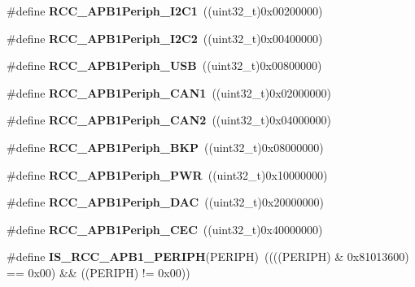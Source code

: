 \begin{DoxyCompactItemize}
\item 
\hypertarget{group__APB1__peripheral_ga594f87d504f7d63697d841033d1538f6}{
\#define {\bfseries RCC\_\-APB1Periph\_\-I2C1}~((uint32\_\-t)0x00200000)}
\label{group__APB1__peripheral_ga594f87d504f7d63697d841033d1538f6}

\item 
\hypertarget{group__APB1__peripheral_ga8eaeded403b5a2277fbfb3896c639416}{
\#define {\bfseries RCC\_\-APB1Periph\_\-I2C2}~((uint32\_\-t)0x00400000)}
\label{group__APB1__peripheral_ga8eaeded403b5a2277fbfb3896c639416}

\item 
\hypertarget{group__APB1__peripheral_ga69a1b3de9a59155bc8455eea5a15e3e4}{
\#define {\bfseries RCC\_\-APB1Periph\_\-USB}~((uint32\_\-t)0x00800000)}
\label{group__APB1__peripheral_ga69a1b3de9a59155bc8455eea5a15e3e4}

\item 
\hypertarget{group__APB1__peripheral_ga7f1d940739de0134ae89e9e04214989d}{
\#define {\bfseries RCC\_\-APB1Periph\_\-CAN1}~((uint32\_\-t)0x02000000)}
\label{group__APB1__peripheral_ga7f1d940739de0134ae89e9e04214989d}

\item 
\hypertarget{group__APB1__peripheral_ga62801597b97816751c038acb1466179c}{
\#define {\bfseries RCC\_\-APB1Periph\_\-CAN2}~((uint32\_\-t)0x04000000)}
\label{group__APB1__peripheral_ga62801597b97816751c038acb1466179c}

\item 
\hypertarget{group__APB1__peripheral_ga2a26b65d0e38030e414a9d39276645b1}{
\#define {\bfseries RCC\_\-APB1Periph\_\-BKP}~((uint32\_\-t)0x08000000)}
\label{group__APB1__peripheral_ga2a26b65d0e38030e414a9d39276645b1}

\item 
\hypertarget{group__APB1__peripheral_ga59ae4e17d5b35a934b1614f8ee883834}{
\#define {\bfseries RCC\_\-APB1Periph\_\-PWR}~((uint32\_\-t)0x10000000)}
\label{group__APB1__peripheral_ga59ae4e17d5b35a934b1614f8ee883834}

\item 
\hypertarget{group__APB1__peripheral_ga8d019a727701634822c19371b6aaabb5}{
\#define {\bfseries RCC\_\-APB1Periph\_\-DAC}~((uint32\_\-t)0x20000000)}
\label{group__APB1__peripheral_ga8d019a727701634822c19371b6aaabb5}

\item 
\hypertarget{group__APB1__peripheral_gaa96437b649e13586945f40dac318a0ae}{
\#define {\bfseries RCC\_\-APB1Periph\_\-CEC}~((uint32\_\-t)0x40000000)}
\label{group__APB1__peripheral_gaa96437b649e13586945f40dac318a0ae}

\item 
\hypertarget{group__APB1__peripheral_gab68e85308494436c4c55a69c42a79f36}{
\#define {\bfseries IS\_\-RCC\_\-APB1\_\-PERIPH}(PERIPH)~((((PERIPH) \& 0x81013600) == 0x00) \&\& ((PERIPH) != 0x00))}
\label{group__APB1__peripheral_gab68e85308494436c4c55a69c42a79f36}

\end{DoxyCompactItemize}
